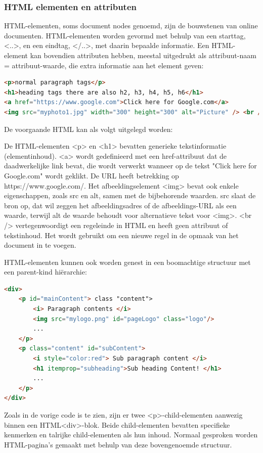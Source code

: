 \subsubsection{HTML elementen en attributen}
HTML-elementen, soms document nodes genoemd, zijn de bouwstenen van online documenten. 
HTML-elementen worden gevormd met behulp van een starttag, <..>, en een eindtag, </..>, met daarin bepaalde informatie. 
Een HTML-element kan bovendien attributen hebben, meestal uitgedrukt als attribuut-naam = attribuut-waarde, die extra informatie aan het element geven:
\begin{lstlisting}[language=HTML, caption=HTML element voorbeeld]
<p>normal paragraph tags</p>
<h1>heading tags there are also h2, h3, h4, h5, h6</h1>
<a href="https://www.google.com">Click here for Google.com</a>
<img src="myphoto1.jpg" width="300" height="300" alt="Picture" /> <br />
\end{lstlisting}
De voorgaande HTML kan als volgt uitgelegd worden:

De HTML-elementen <p> en <h1> bevatten generieke tekstinformatie (elementinhoud).
<a> wordt gedefinieerd met een href-attribuut dat de daadwerkelijke link bevat, die wordt verwerkt wanneer op de tekst "Click here for Google.com" wordt geklikt. De URL heeft betrekking op https://www.google.com/.
Het afbeeldingselement <img> bevat ook enkele eigenschappen, zoals src en alt, samen met de bijbehorende waarden. src slaat de bron op, dat wil zeggen het afbeeldingsadres of de afbeeldings-URL als een waarde, terwijl alt de waarde behoudt voor alternatieve tekst voor <img>.
<br /> vertegenwoordigt een regeleinde in HTML en heeft geen attribuut of tekstinhoud. Het wordt gebruikt om een nieuwe regel in de opmaak van het document in te voegen.

HTML-elementen kunnen ook worden genest in een boomachtige structuur met een parent-kind hiërarchie:
\begin{lstlisting}[language=HTML, caption=HTML-element nesting voorbeeld]
<div>
	<p id="mainContent"> class "content">
		<i> Paragraph contents </i>
		<img src="mylogo.png" id="pageLogo" class="logo"/>
		...
	</p>
	<p class="content" id="subContent">
		<i style="color:red"> Sub paragraph content </i>
		<h1 itemprop="subheading">Sub heading Content! </h1>
		...
	</p>
</div>
\end{lstlisting}
Zoals in de vorige code is te zien, zijn er twee <p>-child-elementen aanwezig binnen een HTML<div>-blok. 
Beide child-elementen bevatten specifieke kenmerken en talrijke child-elementen als hun inhoud. Normaal gesproken worden HTML-pagina's gemaakt met behulp van deze bovengenoemde structuur.\autocite{chapagain2019hands}

